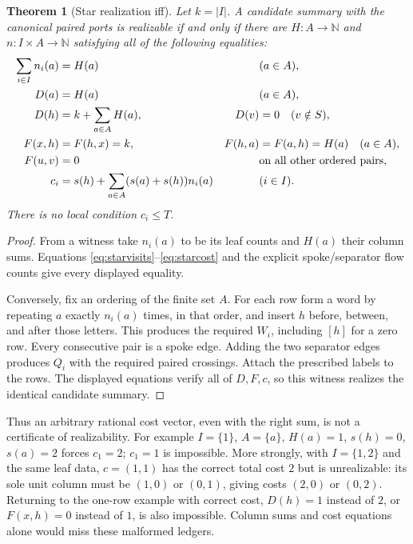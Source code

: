 \documentclass[11pt]{article}
\newtheorem{theorem}[definition]{Theorem}
\theoremstyle{remark}
\newcommand{\N}{\mathbb N}
\begin{document}
\begin{theorem}[Star realization iff]\label{thm:realization}
Let $k=|I|$. A candidate summary with the canonical paired ports is realizable
if and only if there are $H:A\to\N$ and $n:I\times A\to\N$ satisfying all
of the following equalities:
\begin{align}
 \sum_{i\in I}n_i(a)&=H(a) &&(a\in A),\label{eq:cols}\\
 D(a)&=H(a) &&(a\in A),\notag\\
 D(h)&=k+\sum_{a\in A}H(a),& D(v)&=0\quad(v\notin S),\label{eq:ledgerD}\\
 F(x,h)&=F(h,x)=k,& F(h,a)&=F(a,h)=H(a)\quad(a\in A),\label{eq:ledgerF}\\
 F(u,v)&=0 &&\text{on all other ordered pairs},\notag\\
 c_i&=s(h)+\sum_{a\in A}(s(a)+s(h))n_i(a) &&(i\in I).\label{eq:rowcost}
\end{align}
There is no local condition $c_i\le T$.
\end{theorem}
\begin{proof}
From a witness take $n_i(a)$ to be its leaf counts and $H(a)$ their column
sums. Equations \eqref{eq:starvisits}--\eqref{eq:starcost} and the explicit
spoke/separator flow counts give every displayed equality.

Conversely, fix an ordering of the finite set $A$. For each row form a word
by repeating $a$ exactly $n_i(a)$ times, in that order, and insert $h$ before,
between, and after those letters. This produces the required $W_i$, including
$[h]$ for a zero row. Every consecutive pair is a spoke edge. Adding the two
separator edges produces $Q_i$ with the required paired crossings. Attach
the prescribed labels to the rows. The displayed equations verify all of
$D,F,c$, so this witness realizes the identical candidate summary.
\end{proof}

Thus an arbitrary rational cost vector, even with the right sum, is not a
certificate of realizability. For example $I=\{1\}$, $A=\{a\}$,
$H(a)=1$, $s(h)=0$, $s(a)=2$ forces $c_1=2$; $c_1=1$ is impossible.
More strongly, with $I=\{1,2\}$ and the same leaf data, $c=(1,1)$ has the
correct total cost $2$ but is unrealizable: its sole unit column must be
$(1,0)$ or $(0,1)$, giving costs $(2,0)$ or $(0,2)$.
Returning to the one-row example with correct cost, $D(h)=1$ instead of $2$, or
$F(x,h)=0$ instead of $1$, is also impossible. Column sums and cost equations
alone would miss these malformed ledgers.
\end{document}
